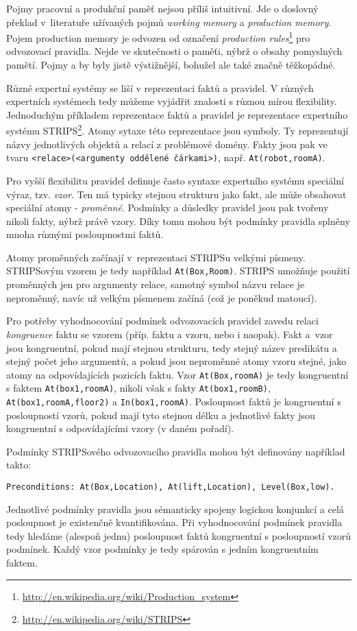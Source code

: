 Pojmy pracovní a produkční paměť nejsou příliš intuitivní. Jde o doslovný
překlad v~literatuře užívaných pojmů \emph{working memory} a \emph{production
memory}. Pojem production memory je odvozen od označení \emph{production
rules}\footnote{\url{http://en.wikipedia.org/wiki/Production\_system}} pro
odvozovací pravidla. Nejde ve skutečnosti o paměťi, nýbrž o obsahy pomyslných
pamětí. Pojmy  a  by
byly jistě výstižnější, bohužel ale také značně těžkopádné.

Různé expertní systémy se liší v reprezentaci faktů a pravidel. V různých
expertních systémech tedy můžeme vyjádřit znalosti s různou mírou flexibility.
Jednoduchým příkladem reprezentace faktů a pravidel je reprezentace expertního
systému STRIPS\footnote{\url{http://en.wikipedia.org/wiki/STRIPS}}. Atomy sytaxe
této reprezentace jsou symboly. Ty reprezentují názvy jednotlivých objektů a
relací z problémové domény. Fakty jsou pak ve tvaru
\verb|<relace>(<argumenty oddělené čárkami>)|, např. \verb|At(robot,roomA)|.

Pro vyšší flexibilitu pravidel definuje často syntaxe expertního systému
speciální výraz, tzv. \emph{vzor}. Ten má typicky stejnou strukturu jako fakt,
ale může obsahovat speciální atomy - \emph{proměnné}. Podmínky a důsledky
pravidel jsou pak tvořeny nikoli fakty, nýbrž právě vzory. Díky tomu mohou být
podmínky pravidla splněny mnoha různými posloupnostmi faktů.

Atomy proměnných začínají v~reprezentaci STRIPSu velkými písmeny. STRIPSovým
vzorem je tedy například \verb|At(Box,Room)|. STRIPS umožňuje použití proměnných
jen pro argumenty relace, samotný symbol názvu relace je neproměnný, navíc už
velkým písmenem začíná (což je poněkud matoucí).

Pro potřeby vyhodnocování podmínek odvozovacích pravidel zavedu relaci
\emph{kongruence} faktu se vzorem (příp. faktu a vzoru, nebo i naopak). Fakt
a~vzor jsou kongruentní, pokud mají stejnou strukturu, tedy stejný název
predikátu a stejný počet jeho argumentů, a pokud jsou neproměnné atomy vzoru
stejné, jako atomy na odpovídajících pozicích faktu. Vzor \verb|At(Box,roomA)|
je tedy kongruentní s faktem \verb|At(box1,roomA)|, nikoli však s fakty
\verb|At(box1,roomB)|, \verb|At(box1,roomA,floor2)| a \verb|In(box1,roomA)|.
Posloupnost faktů je kongruentní s posloupností vzorů, pokud mají tyto stejnou
délku a jednotlivé fakty jsou kongruentní s odpovídajícími vzory (v daném
pořadí).

Podmínky STRIPSového odvozovacího pravidla mohou být definovány například takto:
\begin{verbatim}
Preconditions: At(Box,Location), At(lift,Location), Level(Box,low).
\end{verbatim}
Jednotlivé podmínky pravidla jsou sémanticky spojeny logickou konjunkcí a celá
posloupnost je existenčně kvantifikována. Při vyhodnocování podmínek pravidla
tedy hledáme (alespoň jednu) posloupnost faktů kongruentní s posloupností vzorů
podmínek. Každý vzor podmínky je tedy spárován s jedním kongruentním faktem.

